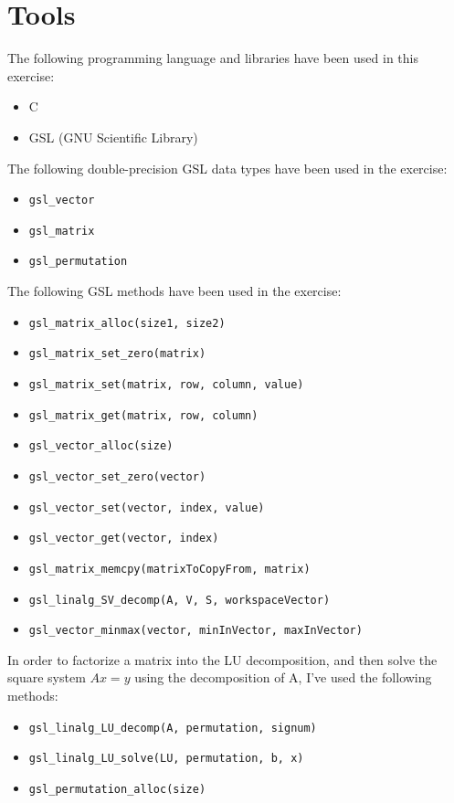 \documentclass{article}
\newcommand{\code}{\texttt}
\begin{document}
\section{Tools}
The following programming language and libraries have been used in this exercise:
\begin{itemize}
  \item C
  \item GSL (GNU Scientific Library)
\end{itemize}
The following double-precision GSL data types have been used in the exercise:
\begin{itemize}
  \item \code{gsl\_vector}
  \item \code{gsl\_matrix}
  \item \code{gsl\_permutation}
\end{itemize}
The following GSL methods have been used in the exercise:
\begin{itemize}
  \item \code{gsl\_matrix\_alloc(size1, size2)}
  \item \code{gsl\_matrix\_set\_zero(matrix)}
  \item \code{gsl\_matrix\_set(matrix, row, column, value)}
  \item \code{gsl\_matrix\_get(matrix, row, column)}
  \item \code{gsl\_vector\_alloc(size)}
  \item \code{gsl\_vector\_set\_zero(vector)}
  \item \code{gsl\_vector\_set(vector, index, value)}
  \item \code{gsl\_vector\_get(vector, index)}
  \item \code{gsl\_matrix\_memcpy(matrixToCopyFrom, matrix)}
  \item \code{gsl\_linalg\_SV\_decomp(A, V, S, workspaceVector)}
  \item \code{gsl\_vector\_minmax(vector, minInVector, maxInVector)}
\end{itemize}
In order to factorize a matrix into the LU decomposition, and then solve the square system $Ax=y$ using the decomposition of A, I've used the following methods:
\begin{itemize}
  \item \code{gsl\_linalg\_LU\_decomp(A, permutation, signum)}
  \item \code{gsl\_linalg\_LU\_solve(LU, permutation, b, x)}
  \item \code{gsl\_permutation\_alloc(size)}
\end{itemize}
  
\end{document}
